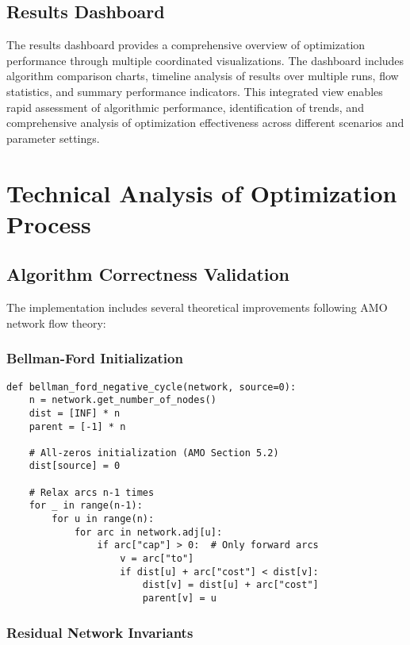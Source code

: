 \documentclass[12pt,a4paper]{article}
\begin{document}
\subsection{Results Dashboard}

The results dashboard provides a comprehensive overview of optimization performance through multiple coordinated visualizations. The dashboard includes algorithm comparison charts, timeline analysis of results over multiple runs, flow statistics, and summary performance indicators. This integrated view enables rapid assessment of algorithmic performance, identification of trends, and comprehensive analysis of optimization effectiveness across different scenarios and parameter settings.

\section{Technical Analysis of Optimization Process}

\subsection{Algorithm Correctness Validation}

The implementation includes several theoretical improvements following AMO network flow theory:

\subsubsection{Bellman-Ford Initialization}
\begin{lstlisting}[caption=Proper Bellman-Ford Implementation]
def bellman_ford_negative_cycle(network, source=0):
    n = network.get_number_of_nodes()
    dist = [INF] * n
    parent = [-1] * n
    
    # All-zeros initialization (AMO Section 5.2)
    dist[source] = 0
    
    # Relax arcs n-1 times
    for _ in range(n-1):
        for u in range(n):
            for arc in network.adj[u]:
                if arc["cap"] > 0:  # Only forward arcs
                    v = arc["to"]
                    if dist[u] + arc["cost"] < dist[v]:
                        dist[v] = dist[u] + arc["cost"]
                        parent[v] = u
\end{lstlisting}

\subsubsection{Residual Network Invariants}
\end{document}
